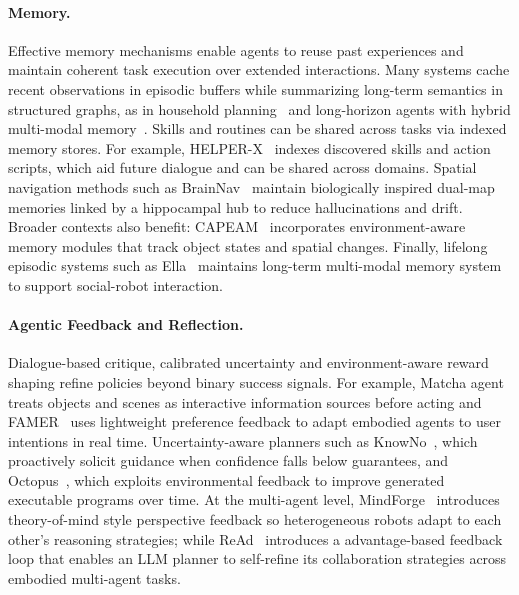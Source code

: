 \paragraph{Memory.}
Effective memory mechanisms enable agents to reuse past experiences and maintain coherent task execution over extended interactions. Many systems cache recent observations in episodic buffers while summarizing long-term semantics in structured graphs, as in household planning~\cite{glocker2025llm} and long-horizon agents with hybrid multi-modal memory~\cite{li2024optimus1}. Skills and routines can be shared across tasks via indexed memory stores. For example, HELPER-X~\cite{sarch2023openendedinstructableembodiedagents} indexes discovered skills and action scripts, which aid future dialogue and can be shared across domains.
Spatial navigation methods such as BrainNav~\cite{ling2025endowingembodiedagentsspatial} maintain biologically inspired dual-map memories linked by a hippocampal hub to reduce hallucinations and drift. Broader contexts also benefit: CAPEAM~\cite{kim2024contextawareplanningenvironmentawarememory} incorporates environment-aware memory modules that track object states and spatial changes. Finally, lifelong episodic systems such as Ella~\cite{zhang2025ellaembodiedsocialagents} maintains long-term multi-modal memory system to support social-robot interaction.


\paragraph{Agentic Feedback and Reflection.}
Dialogue-based critique, calibrated uncertainty and environment-aware reward shaping refine policies beyond binary success signals. For example, Matcha agent~\cite{zhao2023chatenvironmentinteractivemultimodal} treats objects and scenes as interactive information sources before acting and FAMER~\cite{wang2025communicationefficientdesirealignmentembodied} uses lightweight preference feedback to adapt embodied agents to user intentions in real time. Uncertainty-aware planners such as KnowNo~\cite{ren2023robotsaskhelpuncertainty}, which proactively solicit guidance when confidence falls below guarantees, and Octopus~\cite{yang2024octopusembodiedvisionlanguageprogrammer}, which exploits environmental feedback to improve generated executable programs over time. At the multi-agent level, MindForge~\cite{licua2024mindforge} introduces theory-of-mind style perspective feedback so heterogeneous robots adapt to each other’s reasoning strategies; while ReAd~\cite{zhang2024efficientllmgroundingembodied} introduces a advantage-based feedback loop that enables an LLM planner to self-refine its collaboration strategies across embodied multi-agent tasks.



